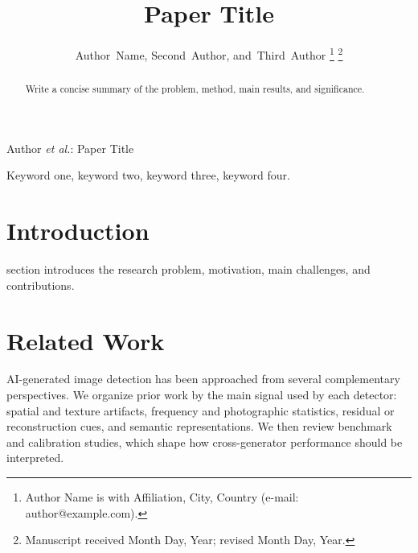 \documentclass[lettersize,journal]{IEEEtran}
\begin{document}
\title{Paper Title}

\author{Author~Name,
        Second~Author,
        and~Third~Author%
\thanks{Author Name is with Affiliation, City, Country (e-mail: author@example.com).}
\thanks{Manuscript received Month Day, Year; revised Month Day, Year.}}

%
{Author \MakeLowercase{\textit{et al.}}: Paper Title}

\maketitle

\begin{abstract}
Write a concise summary of the problem, method, main results, and significance.
\end{abstract}

\begin{IEEEkeywords}
Keyword one, keyword two, keyword three, keyword four.
\end{IEEEkeywords}

\section{Introduction}
 section introduces the research problem, motivation, main challenges, and contributions.

\section{Related Work}
\label{sec:related_work}

AI-generated image detection has been approached from several complementary perspectives. We organize prior work by the main signal used by each detector: spatial and texture artifacts, frequency and photographic statistics, residual or reconstruction cues, and semantic representations. We then review benchmark and calibration studies, which shape how cross-generator performance should be interpreted.
\end{document}

